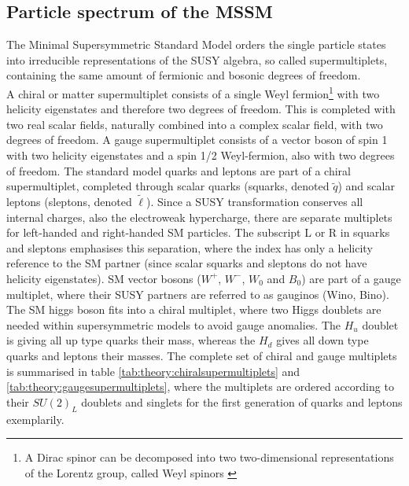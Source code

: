  \subsection{Particle spectrum of the MSSM}

The Minimal Supersymmetric Standard Model orders the single particle states into irreducible representations of the SUSY algebra, so called supermultiplets, containing the same amount of fermionic and bosonic degrees of freedom.\\
 A chiral or matter supermultiplet consists of a single Weyl fermion\footnote{ A Dirac spinor can be decomposed into two two-dimensional representations of the Lorentz group, called Weyl spinors \cite{Peskin}} with two helicity eigenstates and therefore two degrees of freedom. This is completed with two real scalar fields, naturally combined into a complex scalar field, with two degrees of freedom. 
A gauge supermultiplet consists of a vector boson of spin 1 with two helicity eigenstates and a spin 1/2 Weyl-fermion, also with two degrees of freedom.
The standard model quarks and leptons are part of a chiral supermultiplet, completed through scalar quarks (squarks, denoted $\tilde{q}$) and scalar leptons (sleptons, denoted $\tilde{\ell}$). Since a SUSY transformation conserves all internal charges, also the electroweak hypercharge, there are separate multiplets for left-handed and right-handed SM particles. The subscript L or R in squarks and sleptons emphasises this separation, where the index has only a helicity reference to the SM partner (since scalar squarks and sleptons do not have helicity eigenstates).
SM vector bosons ($W^+$, $W^-$, $W_0$ and $B_0$) are part of a gauge multiplet, where their SUSY partners are referred to as gauginos (Wino, Bino).
The SM higgs boson fits into a chiral multiplet, where two Higgs doublets are needed within supersymmetric models to avoid gauge anomalies. The $H_u$ doublet is giving all up type quarks their mass, whereas the $H_d$ gives all down type quarks and leptons their masses. 
The complete set of chiral and gauge multiplets is summarised in table \ref{tab:theory:chiralsupermultiplets} and \ref{tab:theory:gaugesupermultiplets}, where the multiplets are ordered according to their $SU(2)_L$ doublets and singlets for the first generation of quarks and leptons exemplarily.

